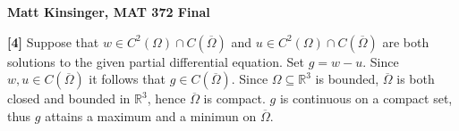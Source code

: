 \documentclass[11pt]{article}
\begin{document}
\vspace*{-.6in}

\begin{center}
{\Large\bf Matt Kinsinger, MAT 372 Final}

\end{center}

\vspace{.5in} {\bf [4]} Suppose that $w\in C^2(\Omega)\cap C(\overline{\Omega})$ and $u\in C^2(\Omega)\cap C(\overline{\Omega})$ are both solutions to the given partial differential equation. Set $g=w-u$. Since $w,u\in C(\overline{\Omega})$ it follows that $g\in C(\overline{\Omega})$. Since $\Omega\subseteq\mathbb{R}^3$ is bounded,  $\overline{\Omega}$ is both closed and bounded in $\mathbb{R}^3$, hence $\overline{\Omega}$ is compact. $g$ is continuous on a compact set, thus $g$ attains a maximum and a minimun on $\overline{\Omega}$.
\end{document}
